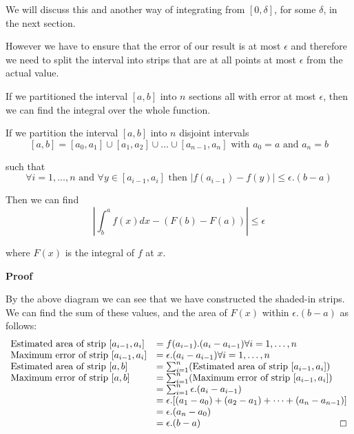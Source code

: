 \documentclass{cs4rep}
\begin{document}
We will discuss this and another way of integrating from
$[0,\delta]$, for some $\delta$, in the next section.

However we have to ensure that the error of our result is at most
$\epsilon$ and therefore we need to split the interval into strips
that are at all points at most $\epsilon$ from the actual value.

If we partitioned the interval $[a,b]$ into $n$ sections all with
error at most $\epsilon$, then we can find the integral over the whole
function.

\begin{myprop} \label{pr:sumint}
If we partition the interval $[a,b]$ into $n$ disjoint intervals 
\[ [a,b] = [a_{0},a_{1}] \cup [a_{1},a_{2}] \cup ... \cup [a_{n-1},a_{n}] \mbox{ with } a_{0} = a \mbox{ and } a_{n} = b \]

such that \[ \forall i = 1,\ldots,n \mbox{ and } \forall y \in [a_{i-1},a_{i}] \mbox{ then } |f(a_{i-1})-f(y)| \leq \epsilon.(b-a) \]

Then we can find \[| \int^{a}_{b} f(x) dx - (F(b)-F(a)) | \leq \epsilon \] 

where $F(x)$ is the integral of $f$ at $x$. 
\end{myprop}

{\bf Proof}

By the above diagram we can see that we have constructed the shaded-in strips. We can find the sum of these values, and the area of $F(x)$ within $\epsilon.(b-a)$ as follows:
\[ \begin{array}{ll}
\mbox{Estimated area of strip } [a_{i-1},a_{i}] & = f(a_{i-1}).(a_{i} - a_{i-1}) \forall i = 1,\ldots,n \\
\mbox{Maximum error of strip } [a_{i-1},a_{i}] & = \epsilon . (a_{i} - a_{i-1}) \forall i = 1,\ldots,n \\
\mbox{Estimated area of strip } [a,b] & = \sum_{i=1}^{n} (\mbox{Estimated area of strip } [a_{i-1},a_{i}]) \\
\mbox{Maximum error of strip } [a,b] & = \sum_{i=1}^{n} (\mbox{Maximum error of strip } [a_{i-1},a_{i}])  \\
& = \sum_{i=1}^{n}  \epsilon . (a_{i} - a_{i-1}) \\
& = \epsilon . [(a_{1} - a_{0}) + (a_{2} - a_{1}) + \dots + (a_{n} - a_{n-1})] \\
& = \epsilon . (a_{n} - a_{0}) \\
& = \epsilon . (b-a) \hfill \boxempty
\end{array} \] 
\end{document}
